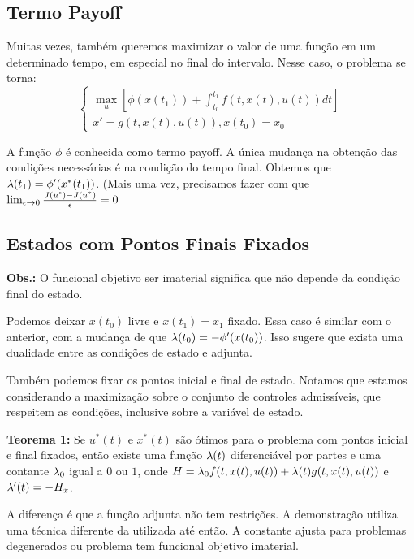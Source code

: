 \subsection{Termo Payoff}


Muitas vezes, também queremos maximizar o valor de uma função em um determinado tempo, em especial no final do intervalo. Nesse caso, o problema se torna:
\begin{equation*}
    \begin{cases}
    \max_u [\phi(x(t_1)) + \int_{t_0}^{t_1} f(t, x(t),u(t))dt] \\
    x' = g(t,x(t),u(t)), x(t_0) = x_0
    \end{cases}
\end{equation*}

A função $\phi$ é conhecida como termo payoff. A única mudança na obtenção das condições necessárias é na condição do tempo final. Obtemos que $\lambda(t_1) = \phi '(x^*(t_1))$. (Mais uma vez, precisamos fazer com que $\lim_{\epsilon \to 0} \frac{J(u^{\epsilon}) - J(u^*)}{\epsilon} = 0$

\subsection{Estados com Pontos Finais Fixados}

\textbf{Obs.:} O funcional objetivo ser imaterial significa que não depende da condição final do estado. 

Podemos deixar $x(t_0)$ livre e $x(t_1) = x_1$ fixado. Essa caso é similar com
o anterior, com a mudança de que $\lambda(t_0) = - \phi '(x(t_0))$. Isso sugere
que exista uma dualidade entre as condições de estado e adjunta.

Também podemos fixar os pontos inicial e final de estado. Notamos que estamos considerando a maximização sobre o conjunto de controles admissíveis, que respeitem as condições, inclusive sobre a variável de estado. 

\textbf{Teorema 1:} Se $u^*(t)$ e $x^*(t)$ são ótimos para o problema com pontos inicial e final fixados, então existe uma função $\lambda(t)$ diferenciável por partes e uma contante $\lambda_0$ igual a $0$ ou $1$, onde $H = \lambda_0f(t,x(t),u(t)) + \lambda(t)g(t,x(t),u(t))$ e $\lambda '(t) = - H_x$. 

A diferença é que a função adjunta não tem restrições. A demonstração utiliza uma técnica diferente da utilizada até então. A constante ajusta para problemas degenerados ou problema tem funcional objetivo imaterial.